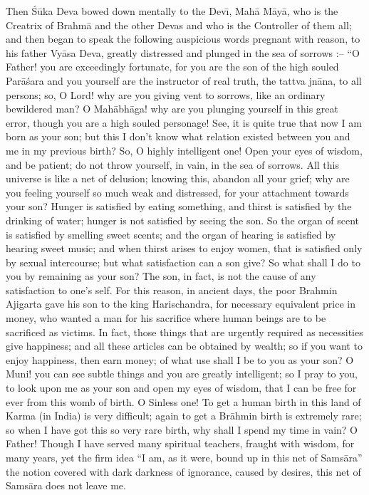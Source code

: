 Then \'S\=uka Deva bowed down mentally to the Dev\={\i}, Mah\=a M\=ay\=a, who is the Creatrix of Brahm\=a and the other Devas and who is the Controller of them all; and then began to speak the following auspicious words pregnant with reason, to his father Vy\=asa Deva, greatly distressed and plunged in the sea of sorrows :-- ``O Father! you are exceedingly fortunate, for you are the son of the high souled Par\=a\'sara and you yourself are the instructor of real truth, the tattva jn\=ana, to all persons; so, O Lord! why are you giving vent to sorrows, like an ordinary bewildered man? O Mah\=abh\=aga! why are you plunging yourself in this great error, though you are a high souled personage! See, it is quite true that now I am born as your son; but this I don't know what relation existed between you and me in my previous birth? So, O highly intelligent one! Open your eyes of wisdom, and be patient; do not throw yourself, in vain, in the sea of sorrows. All this universe is like a net of delusion; knowing this, abandon all your grief; why are you feeling yourself so much weak and distressed, for your attachment towards your son? Hunger is satisfied by eating something, and thirst is satisfied by the drinking of water; hunger is not satisfied by seeing the son. So the organ of scent is satisfied by smelling sweet scents; and the organ of hearing is satisfied by hearing sweet music; and when thirst arises to enjoy women, that is satisfied only by sexual intercourse; but what satisfaction can a son give? So what shall I do to you by remaining as your son? The son, in fact, is not the cause of any satisfaction to one's self. For this reason, in ancient days, the poor Brahmin Ajigarta gave his son to the king Harischandra, for necessary equivalent price in money, who wanted a man for his sacrifice where human beings are to be sacrificed as victims. In fact, those things that are urgently required as necessities give happiness; and all these articles can be obtained by wealth; so if you want to enjoy happiness, then earn money; of what use shall I be to you as your son? O Muni! you can see subtle things and you are greatly intelligent; so I pray to you, to look upon me as your son and open my eyes of wisdom, that I can be free for ever from this womb of birth. O Sinless one! To get a human birth in this land of Karma (in India) is very difficult; again to get a Br\=ahmin birth is extremely rare; so when I have got this so very rare birth, why shall I spend my time in vain? O Father! Though I have served many spiritual teachers, fraught with wisdom, for many years, yet the firm idea ``I am, as it were, bound up in this net of Sams\=ara'' the notion covered with dark darkness of ignorance, caused by desires, this net of Sams\=ara does not leave me.

